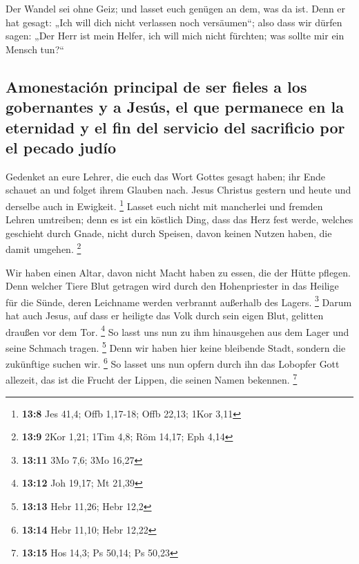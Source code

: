  Der Wandel sei ohne Geiz; und lasset euch genügen an dem,
was da ist. Denn er hat gesagt: „Ich will dich nicht verlassen noch
versäumen``;  also dass wir dürfen sagen: „Der Herr ist
mein Helfer, ich will mich nicht fürchten; was sollte mir ein Mensch
tun?{}``

\hypertarget{amonestaciuxf3n-principal-de-ser-fieles-a-los-gobernantes-y-a-jesuxfas-el-que-permanece-en-la-eternidad-y-el-fin-del-servicio-del-sacrificio-por-el-pecado-juduxedo}{%
\subsection{Amonestación principal de ser fieles a los gobernantes y a
Jesús, el que permanece en la eternidad y el fin del servicio del
sacrificio por el pecado
judío}\label{amonestaciuxf3n-principal-de-ser-fieles-a-los-gobernantes-y-a-jesuxfas-el-que-permanece-en-la-eternidad-y-el-fin-del-servicio-del-sacrificio-por-el-pecado-juduxedo}}

 Gedenket an eure Lehrer, die euch das Wort Gottes gesagt
haben; ihr Ende schauet an und folget ihrem Glauben nach. 
Jesus Christus gestern und heute und derselbe auch in Ewigkeit.
\footnote{\textbf{13:8} Jes 41,4; Offb 1,17-18; Offb 22,13; 1Kor 3,11}
 Lasset euch nicht mit mancherlei und fremden Lehren
umtreiben; denn es ist ein köstlich Ding, dass das Herz fest werde,
welches geschieht durch Gnade, nicht durch Speisen, davon keinen Nutzen
haben, die damit umgehen. \footnote{\textbf{13:9} 2Kor 1,21; 1Tim 4,8;
  Röm 14,17; Eph 4,14}

 Wir haben einen Altar, davon nicht Macht haben zu essen,
die der Hütte pflegen.  Denn welcher Tiere Blut getragen
wird durch den Hohenpriester in das Heilige für die Sünde, deren
Leichname werden verbrannt außerhalb des Lagers. \footnote{\textbf{13:11}
  3Mo 7,6; 3Mo 16,27}  Darum hat auch Jesus, auf dass er
heiligte das Volk durch sein eigen Blut, gelitten draußen vor dem Tor.
\footnote{\textbf{13:12} Joh 19,17; Mt 21,39}  So lasst
uns nun zu ihm hinausgehen aus dem Lager und seine Schmach tragen.
\footnote{\textbf{13:13} Hebr 11,26; Hebr 12,2}  Denn wir
haben hier keine bleibende Stadt, sondern die zukünftige suchen wir.
\footnote{\textbf{13:14} Hebr 11,10; Hebr 12,22}  So
lasset uns nun opfern durch ihn das Lobopfer Gott allezeit, das ist die
Frucht der Lippen, die seinen Namen bekennen. \footnote{\textbf{13:15}
  Hos 14,3; Ps 50,14; Ps 50,23}

